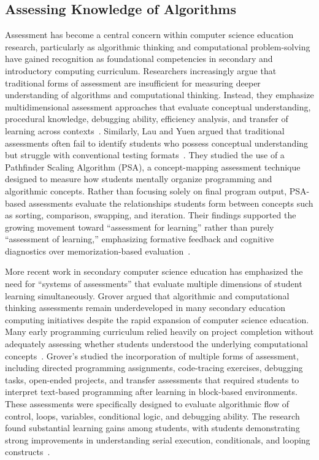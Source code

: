 \subsection{Assessing Knowledge of Algorithms}
Assessment has become a central concern within computer science education research, particularly as algorithmic thinking and computational
  problem-solving have gained recognition as foundational competencies in secondary and introductory computing curriculum.
Researchers increasingly argue that traditional forms of assessment are insufficient for measuring deeper understanding of algorithms and
  computational thinking.
Instead, they emphasize multidimensional assessment approaches that evaluate conceptual understanding, procedural knowledge, debugging ability,
  efficiency analysis, and transfer of learning across contexts~\cite{grover2021teaching,osti2007}.
Similarly, Lau and Yuen argued that traditional assessments often fail to identify students who possess conceptual understanding but struggle with
  conventional testing formats~\cite{lau2009}.
They studied the use of a Pathfinder Scaling Algorithm (PSA), a concept-mapping assessment technique designed to measure how students mentally
  organize programming and algorithmic concepts.
Rather than focusing solely on final program output, PSA-based assessments evaluate the relationships students form between concepts such as sorting,
  comparison, swapping, and iteration.
Their findings supported the growing movement toward “assessment for learning” rather than purely “assessment of learning,” emphasizing formative
  feedback and cognitive diagnostics over memorization-based evaluation~\cite{lau2009}.

More recent work in secondary computer science education has emphasized the need for “systems of assessments” that evaluate multiple dimensions of
  student learning simultaneously.
Grover argued that algorithmic and computational thinking assessments remain underdeveloped in many secondary education computing initiatives despite
  the rapid expansion of computer science education.
Many early programming curriculum relied heavily on project completion without adequately assessing whether students understood the underlying
  computational concepts~\cite{grover2017assessing}.
Grover's studied the incorporation of multiple forms of assessment, including directed programming assignments, code-tracing exercises, debugging
  tasks, open-ended projects, and transfer assessments that required students to interpret text-based programming after learning in block-based
  environments.
These assessments were specifically designed to evaluate algorithmic flow of control, loops, variables, conditional logic, and debugging ability.
The research found substantial learning gains among students, with students demonstrating strong improvements in understanding serial execution,
  conditionals, and looping constructs~\cite{grover2017assessing}.

